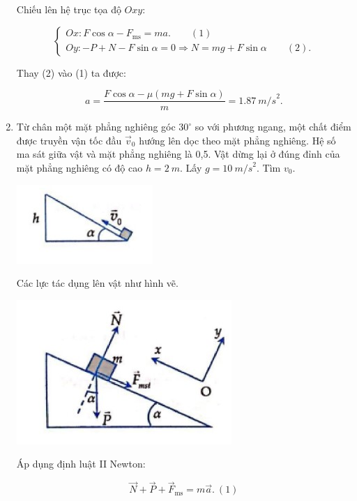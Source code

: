 \begin{enumerate}[label=\bfseries Bài \arabic*:]
{		Chiếu lên hệ trục tọa độ $Oxy$:
		
		$$\begin{cases}
			Ox: F\cos \alpha - F_\text{ms} =ma.\qquad (1) \\
			Oy: - P + N - F\sin \alpha= 0 \Rightarrow N =mg + F \sin \alpha\qquad (2).
			
		\end{cases}$$
		
		Thay (2) vào (1) ta được:
		
		$$ a = \dfrac{F \cos \alpha - \mu (mg + F\sin \alpha)}{m} = \SI{1,87}{m/s}^2. $$
		
	} 

\item {}


{
	Từ chân một mặt phẳng nghiêng góc $30^\circ$ so với phương ngang, một chất điểm được truyền vận tốc đầu $\vec v_0$ hướng lên dọc theo mặt phẳng nghiêng. Hệ số ma sát giữa vật và mặt phẳng nghiêng là 0,5. Vật dừng lại ở đúng đỉnh của mặt phẳng nghiêng có độ cao $h =\SI{2}{m}.$ Lấy $ g = \SI{10}{m/s}^2$. Tìm $v_0$.
	
	\begin{center}
		\includegraphics[scale=1]{../figs/VN10-2022-PH-TP021-9.jpg}
	\end{center}
}

\hideall
{
	
	Các lực tác dụng lên vật như hình vẽ.
	\begin{center}
		\includegraphics[scale=1]{../figs/VN10-2022-PH-TP021-10.jpg}
	\end{center}
	Áp dụng định luật II Newton:
	
	$$\vec N + \vec P + \vec F_\text{ms} = m\vec a.\ (1)$$
	
}
\end{enumerate}
